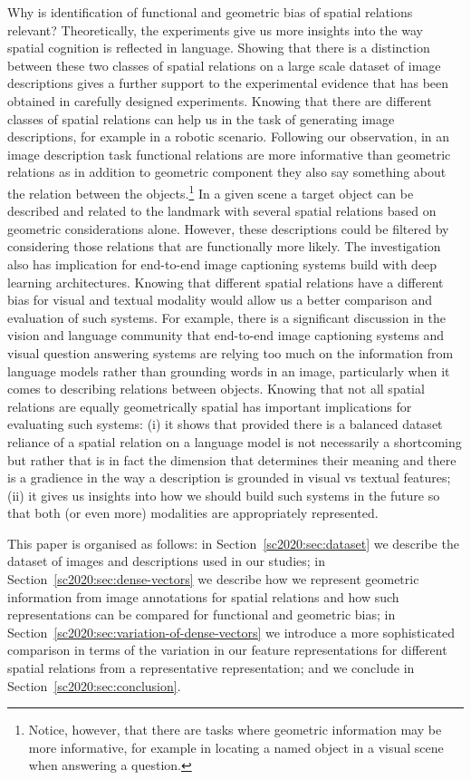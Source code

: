 Why is identification of functional and geometric bias of spatial
relations relevant? Theoretically, the experiments give us more
insights into the way spatial cognition is reflected in
language. Showing that there is a distinction between these two
classes of spatial relations on a large scale dataset of image
descriptions gives a further support to the experimental evidence that
has been obtained in carefully designed experiments. Knowing that
there are different classes of spatial relations can help us in the
task of generating image descriptions, for example in a robotic
scenario. Following our observation, in an image description task
functional relations are more informative than geometric
relations as in addition to geometric component they also say
something about the relation between the objects.\footnote{Notice,
  however, that there are tasks where geometric information may be
  more informative, for example in locating a named object in a visual
  scene when answering a question.} In a given scene a target object
can be described and related to the landmark with several spatial
relations based on geometric considerations alone. However, these
descriptions could be filtered by considering those relations that are
functionally more likely. The investigation also has implication for
end-to-end image captioning systems build with deep learning
architectures. Knowing that different spatial relations have a
different bias for visual and textual modality would allow us a better
comparison and evaluation of such systems. For example, there is a
significant discussion in the vision and language community that
end-to-end image captioning systems and visual question answering
systems are relying too much on the information from language models
\cite{Agrawal:2017aa} rather than grounding words in an image,
particularly when it comes to describing relations between
objects. Knowing that not all spatial relations are equally
geometrically spatial has important implications for evaluating such
systems: (i) it shows that provided there is a balanced dataset
reliance of a spatial relation on a language model is not necessarily
a shortcoming but rather that is in fact the dimension that determines their
meaning and there is a gradience in the way a description is grounded
in visual vs textual features; (ii) it gives us insights into how we should
build such systems in the future so that both (or even more)
modalities are appropriately represented.

This paper is organised as follows: in Section~\ref{sc2020:sec:dataset} we
describe the dataset of images and descriptions used in our studies; in
Section~\ref{sc2020:sec:dense-vectors} we describe how we represent geometric
information from image annotations for spatial relations and how such
representations can be compared for functional and geometric bias; in
Section~\ref{sc2020:sec:variation-of-dense-vectors} we introduce a more
sophisticated comparison in terms of the variation in our feature
representations for different spatial relations from a representative
representation; and we conclude in Section~\ref{sc2020:sec:conclusion}.





